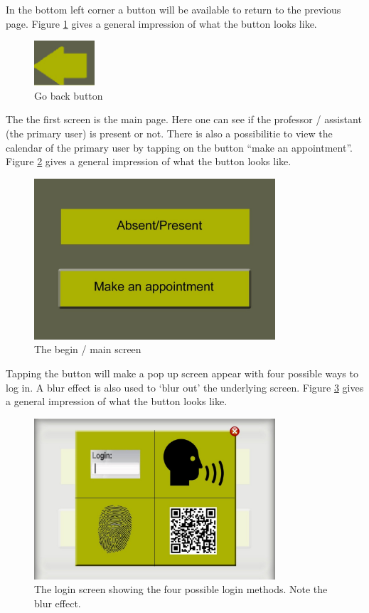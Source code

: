\documentclass[11pt, a4paper,svglistings]{report}
\begin{document}
In the bottom left corner a button will be available to return to the previous page. Figure \ref{fig:GoBackButton} gives a general impression of what the button looks like.
\begin{figure}[H]
\centering
    \includegraphics[width=0.2\textwidth]{Back.png}
  \caption[Go Back Button]{\label{fig:GoBackButton} Go back button}
\end{figure}

The the first screen is the main page. Here one can see if the professor / assistant (the primary user) is present or not.  There is also a possibilitie to view the calendar of the primary user by tapping on the button ``make an appointment''. Figure \ref{fig:BeginScreen} gives a general impression of what the button looks like.
\begin{figure}[H]
\centering
    \includegraphics[width=0.8\textwidth]{Main.jpg}
  \caption{\label{fig:BeginScreen} The begin / main screen}
\end{figure}

Tapping the button will make a pop up screen appear with four possible ways to log in. A blur effect is also used to `blur out' the underlying screen. Figure \ref{fig:LoginScreen} gives a general impression of what the button looks like.
\begin{figure}[H]
\centering
    \includegraphics[width=0.8\textwidth]{Login.jpg}
  \caption[Login screen]{\label{fig:LoginScreen} The login screen showing the four possible login methods. Note the blur effect.}
\end{figure}
\end{document}

